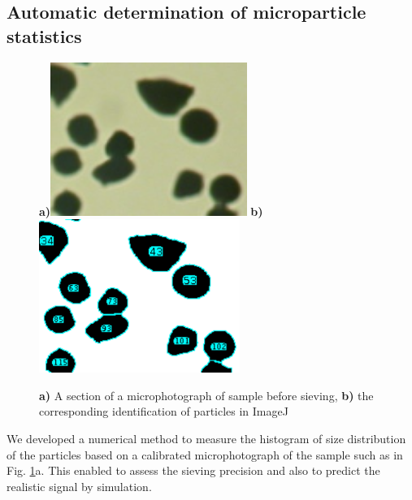 \subsection{Automatic determination of microparticle statistics}
\begin{figure}[ht] \caption{\textbf{a)} A section of a microphotograph of sample before sieving, \textbf{b)} the corresponding identification of particles in ImageJ} \label{fg_sievingstats} \centering 
\textbf{a)}\includegraphics[height=5cm]{img/technology/imagej_photo.pdf}
\textbf{b)}\includegraphics[height=5cm]{img/technology/imagej_found.pdf}
\end{figure}

We developed a numerical method to measure the histogram of size distribution of the particles based on a calibrated microphotograph of the sample such as in Fig. \ref{fg_sievingstats}a. This enabled to assess the sieving precision and also to predict the realistic signal by simulation.

